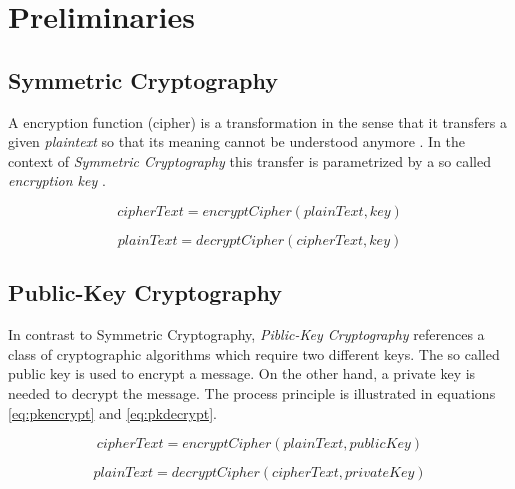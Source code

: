 \chapter{Preliminaries}
\label{chapter:pre}


\section{Symmetric Cryptography} \label{section:pre:symcrypto}


A encryption function (cipher) is a transformation in the sense that it transfers a given \textit{plaintext} so that its meaning cannot be understood anymore \citep[section 1.4]{HAC}. In the context of \textit{Symmetric Cryptography} this transfer is parametrized by a so called \textit{encryption key}  \citep[section 1.5]{HAC}.

\begin{equation} \label{eq:skencrypt}
	cipherText = encryptCipher(plainText, key)
\end{equation}

\begin{equation} \label{eq:skdecrypt}
	plainText = decryptCipher(cipherText, key)
\end{equation}


\section{Public-Key Cryptography}
\label{section:pre:publiccrypto}

In contrast to  {Symmetric Cryptography}, \textit{Piblic-Key Cryptography} references a class of cryptographic algorithms which require two different keys. \citep[section 1.8]{HAC} The so called public key is used to encrypt a message. On the other hand, a private key is needed to decrypt the message. The process principle is illustrated in equations \ref{eq:pkencrypt} and \ref{eq:pkdecrypt}. 

\begin{equation} \label{eq:pkencrypt}
	cipherText = encryptCipher(plainText, publicKey)
\end{equation}

\begin{equation} \label{eq:pkdecrypt}
	plainText = decryptCipher(cipherText, privateKey)
\end{equation}


